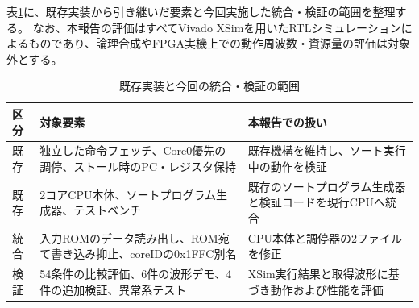 表\ref{tab:1}に、既存実装から引き継いだ要素と今回実施した統合・検証の範囲を整理する。
なお、本報告の評価はすべてVivado XSimを用いたRTLシミュレーションによるものであり、論理合成やFPGA実機上での動作周波数・資源量の評価は対象外とする。

\begin{table}[H]
\centering
\caption{既存実装と今回の統合・検証の範囲}
\label{tab:1}
\footnotesize
\setlength{\tabcolsep}{3pt}
\renewcommand{\arraystretch}{1.25}
\begin{tabular}{>{\raggedright\arraybackslash}p{}>{\raggedright\arraybackslash}p{}>{\raggedright\arraybackslash}p{}}\toprule
\textbf{区分} & \textbf{対象要素} & \textbf{本報告での扱い}\\\midrule
既存 & 独立した命令フェッチ、Core0優先の調停、ストール時のPC・レジスタ保持 & 既存機構を維持し、ソート実行中の動作を検証\\
既存 & 2コアCPU本体、ソートプログラム生成器、テストベンチ & 既存のソートプログラム生成器と検証コードを現行CPUへ統合\\
統合 & 入力ROMのデータ読み出し、ROM宛て書き込み抑止、coreIDの0x1FFC別名 & CPU本体と調停器の2ファイルを修正\\
検証 & 54条件の比較評価、6件の波形デモ、4件の追加検証、異常系テスト & XSim実行結果と取得波形に基づき動作および性能を評価\\
\bottomrule\end{tabular}
\end{table}
